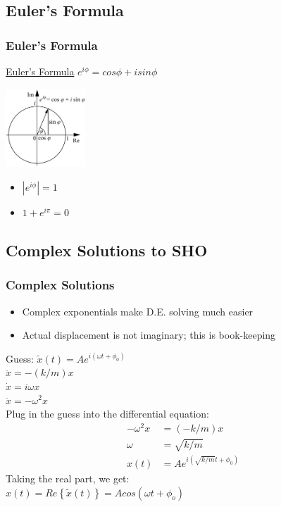 \documentclass[pdf,hideothersubsections]{beamer}
\begin{document}
\subsection{Euler's Formula}
\begin{frame}
\frametitle{Euler's Formula}

\begin{block}{\href{http://mathworld.wolfram.com/EulerFormula.html}{Euler's Formula}}
$e^{i \phi} = cos \phi + i sin \phi$
\end{block}
\pause
\includegraphics[width=3cm]{Euler-formula.png}
\pause
\begin{itemize}
\item $|e^{i \phi}| = 1$
\pause
\item $1 + e^{i \pi} = 0$
\end{itemize}

\end{frame}

\subsection{Complex Solutions to SHO}
\begin{frame}
\frametitle{Complex Solutions}
\begin{itemize}
\item Complex exponentials make D.E. solving much easier
\pause
\item Actual displacement is not imaginary; this is book-keeping
\pause
\end{itemize}
Guess: $\tilde{x}(t) = A e^{i (\omega t + \phi_0)}$ \\
\pause
$\ddot{x} = -(k/m) x$ \\
\pause
$\dot{x} = i \omega x$ \\
\pause
$\ddot{x} = -\omega^2 x$ \\
Plug in the guess into the differential equation:
\begin{align*}
-\omega^2 x &= (-k/m) x \\
\omega &= \sqrt{k/m} \\
x(t) &= A e^{i (\sqrt{k/m} t + \phi_0)}
\end{align*}
\pause
Taking the real part, we get: \\
\pause
$x(t) = Re\left\{\tilde{x}(t)\right\} = A cos(\omega t + \phi_o)$

\end{frame}
\end{document}
